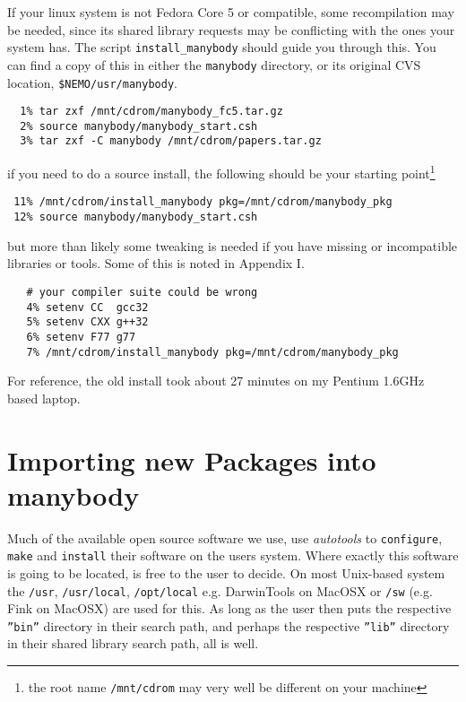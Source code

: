 \begin{itemize}
\begin{itemize}
If your linux system is not Fedora Core 5
or compatible, some recompilation may be needed, since its shared library requests
may be conflicting with the ones your system has.
The script
{\tt install\_manybody} should guide you through this. You can find a copy
of this in either the {\tt manybody} directory, or its original CVS location,
{\tt \$NEMO/usr/manybody}.

\footnotesize\begin{verbatim}
  1% tar zxf /mnt/cdrom/manybody_fc5.tar.gz
  2% source manybody/manybody_start.csh
  3% tar zxf -C manybody /mnt/cdrom/papers.tar.gz

\end{verbatim}\normalsize

if you need to do a source install, the following should be 
your starting point\footnote{the root name {\tt /mnt/cdrom} may
very well be different on your machine}

\footnotesize\begin{verbatim}
 11% /mnt/cdrom/install_manybody pkg=/mnt/cdrom/manybody_pkg
 12% source manybody/manybody_start.csh
\end{verbatim}\normalsize

but more than likely some tweaking is needed if you have missing or
incompatible libraries or tools. Some of this is noted in Appendix I.


\footnotesize\begin{verbatim}
   # your compiler suite could be wrong
   4% setenv CC  gcc32
   5% setenv CXX g++32
   6% setenv F77 g77
   7% /mnt/cdrom/install_manybody pkg=/mnt/cdrom/manybody_pkg
\end{verbatim}\normalsize


For reference, the old install took about 27 minutes on my Pentium 1.6GHz based
laptop.

\section{Importing new Packages into manybody}

Much of the available open source software we use, use
{\it autotools} to {\tt configure}, {\tt make} and {\tt install} their
software on the users system. Where exactly this software is going to be located,
is free to the user to decide. On most Unix-based system the {\tt /usr},
{\tt /usr/local}, {\tt /opt/local} {e.g. DarwinTools on MacOSX} 
or {\tt /sw} (e.g. Fink on MacOSX) are used for this.
As long
as the user then puts the respective {\tt ''bin''} directory in their search
path, and perhaps the respective {\tt ''lib''}  directory in their 
shared library search path, all is well.


\end{itemize}
\end{itemize}
